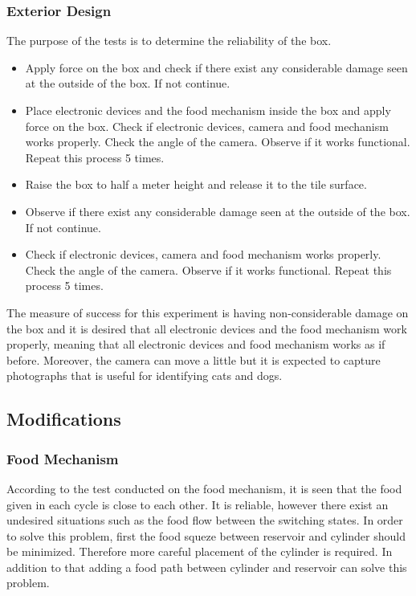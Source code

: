 \subsubsection{Exterior Design}
The purpose of the tests is to determine the reliability of the box.
\begin{itemize}
    \item Apply force on the box and check if there exist any considerable damage seen at the outside of the box. If not continue.
    \item Place electronic devices and the food mechanism inside the box and apply force on the box. Check if electronic devices, camera and food mechanism works properly. Check the angle of the camera. Observe if it works functional. Repeat this process 5 times. 
\end{itemize}

\begin{itemize}
    \item Raise the box to half a meter height and release it to the tile surface. \item Observe if there exist any considerable damage seen at the outside of the box. If not continue.
    \item Check if electronic devices, camera and food mechanism works properly. Check the angle of the camera. Observe if it works functional. Repeat this process 5 times. 
\end{itemize}

The measure of success for this experiment is having non-considerable damage on the box and it is desired that all electronic devices and the food mechanism work properly, meaning that all electronic devices and food mechanism works as if before. Moreover, the camera can move a little but it is expected to capture photographs that is useful for identifying cats and dogs.

\subsection{Modifications}
\subsubsection{Food Mechanism}
According to the test conducted on the food mechanism, it is seen that the food given in each cycle is close to each other. It is reliable, however there exist an undesired situations such as the food flow between the switching states. In order to solve this problem, first the food squeze between reservoir and cylinder should be minimized. Therefore more careful placement of the cylinder is required. In addition to that adding a food path between cylinder and reservoir can solve this problem.

